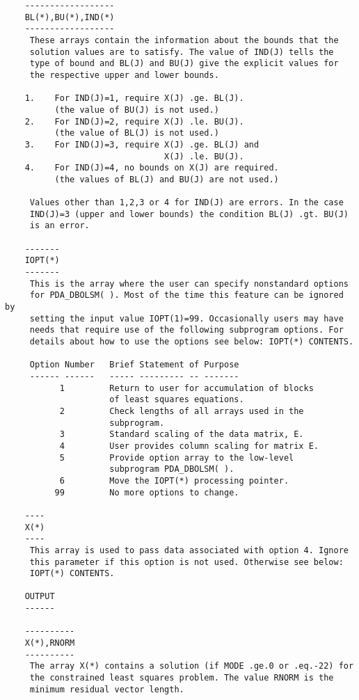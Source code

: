 \begin{verbatim}
    ------------------
    BL(*),BU(*),IND(*)
    ------------------
     These arrays contain the information about the bounds that the
     solution values are to satisfy. The value of IND(J) tells the
     type of bound and BL(J) and BU(J) give the explicit values for
     the respective upper and lower bounds.

    1.    For IND(J)=1, require X(J) .ge. BL(J).
          (the value of BU(J) is not used.)
    2.    For IND(J)=2, require X(J) .le. BU(J).
          (the value of BL(J) is not used.)
    3.    For IND(J)=3, require X(J) .ge. BL(J) and
                                X(J) .le. BU(J).
    4.    For IND(J)=4, no bounds on X(J) are required.
          (the values of BL(J) and BU(J) are not used.)

     Values other than 1,2,3 or 4 for IND(J) are errors. In the case
     IND(J)=3 (upper and lower bounds) the condition BL(J) .gt. BU(J)
     is an error.

    -------
    IOPT(*)
    -------
     This is the array where the user can specify nonstandard options
     for PDA_DBOLSM( ). Most of the time this feature can be ignored by
     setting the input value IOPT(1)=99. Occasionally users may have
     needs that require use of the following subprogram options. For
     details about how to use the options see below: IOPT(*) CONTENTS.

     Option Number   Brief Statement of Purpose
     ------ ------   ----- --------- -- -------
           1         Return to user for accumulation of blocks
                     of least squares equations.
           2         Check lengths of all arrays used in the
                     subprogram.
           3         Standard scaling of the data matrix, E.
           4         User provides column scaling for matrix E.
           5         Provide option array to the low-level
                     subprogram PDA_DBOLSM( ).
           6         Move the IOPT(*) processing pointer.
          99         No more options to change.

    ----
    X(*)
    ----
     This array is used to pass data associated with option 4. Ignore
     this parameter if this option is not used. Otherwise see below:
     IOPT(*) CONTENTS.

    OUTPUT
    ------

    ----------
    X(*),RNORM
    ----------
     The array X(*) contains a solution (if MODE .ge.0 or .eq.-22) for
     the constrained least squares problem. The value RNORM is the
     minimum residual vector length.


\end{verbatim}
